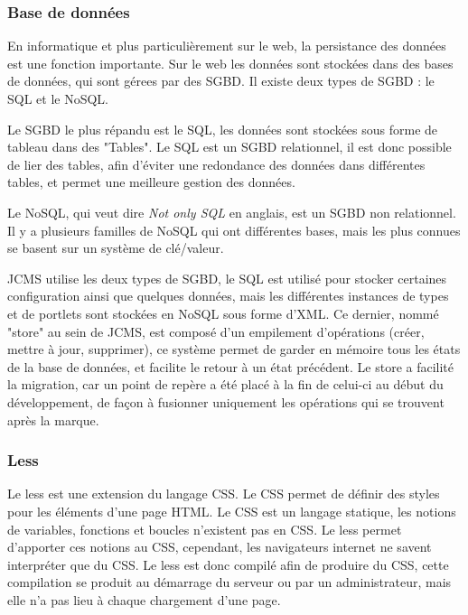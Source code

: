\documentclass[12pt,a4paper]{article}
\begin{document}
\subsubsection{Base de données}
En informatique et plus particulièrement sur le web, la persistance des données est une fonction importante. Sur le web les données sont stockées dans des bases de données, qui sont gérees par des \gls{SGBD}. Il existe deux types de \gls{SGBD} : le SQL et le NoSQL.\par 
\medskip
Le \gls{SGBD} le plus répandu est le SQL, les données sont stockées sous forme de tableau dans des "Tables". Le SQL est un \gls{SGBD} relationnel, il est donc possible de lier des tables, afin d'éviter une redondance des données dans différentes tables, et permet une meilleure gestion des données.\par
\medskip
Le NoSQL, qui veut dire \textit{Not only SQL} en anglais, est un \gls{SGBD} non relationnel. Il y a plusieurs familles de NoSQL qui ont différentes bases, mais les plus connues se basent sur un système de clé/valeur.\par
\medskip
\gls{JCMS} utilise les deux types de \gls{SGBD}, le SQL est utilisé pour stocker certaines configuration ainsi que quelques données, mais les différentes instances de types et de portlets sont stockées en NoSQL sous forme d'XML. Ce dernier, nommé "store" au sein de \gls{JCMS}, est composé d'un empilement d'opérations (créer, mettre à jour, supprimer), ce système permet de garder en mémoire tous les états de la base de données, et facilite le retour à un état précédent. Le store a facilité la migration, car un point de repère a été placé à la fin de celui-ci au début du développement, de façon à fusionner uniquement les opérations qui se trouvent après la marque.\par

\subsubsection{Less}
Le less est une extension du langage CSS. Le CSS permet de définir des styles pour les éléments d'une page HTML. Le CSS est un langage statique, les notions de variables, fonctions et boucles n'existent pas en CSS. Le less permet d'apporter ces notions au CSS, cependant, les navigateurs internet ne savent interpréter que du CSS. Le less est donc compilé afin de produire du CSS, cette compilation se produit au démarrage du serveur ou par un administrateur, mais elle n'a pas lieu à chaque chargement d'une page.\par 
\end{document}
